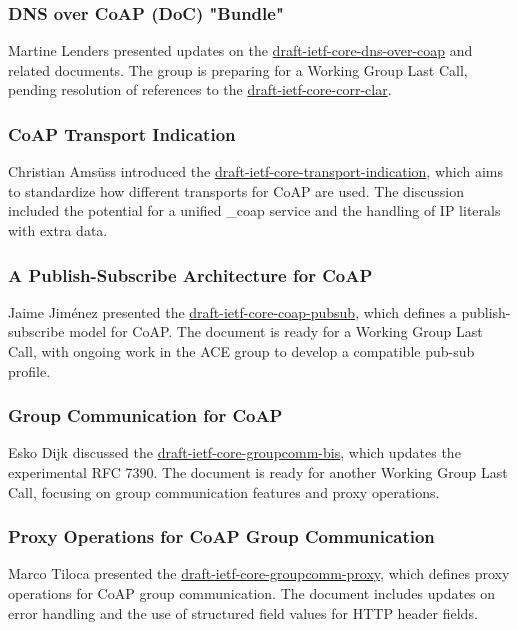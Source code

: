 \documentclass{article}
\begin{document}
\subsubsection{DNS over CoAP (DoC) "Bundle"}
Martine Lenders presented updates on the \href{https://datatracker.ietf.org/doc/html/draft-ietf-core-dns-over-coap}{draft-ietf-core-dns-over-coap} and related documents. The group is preparing for a Working Group Last Call, pending resolution of references to the \href{https://datatracker.ietf.org/doc/html/draft-ietf-core-corr-clar}{draft-ietf-core-corr-clar}.

\subsubsection{CoAP Transport Indication}
Christian Amsüss introduced the \href{https://datatracker.ietf.org/doc/html/draft-ietf-core-transport-indication}{draft-ietf-core-transport-indication}, which aims to standardize how different transports for CoAP are used. The discussion included the potential for a unified \_coap service and the handling of IP literals with extra data.

\subsubsection{A Publish-Subscribe Architecture for CoAP}
Jaime Jiménez presented the \href{https://datatracker.ietf.org/doc/html/draft-ietf-core-coap-pubsub}{draft-ietf-core-coap-pubsub}, which defines a publish-subscribe model for CoAP. The document is ready for a Working Group Last Call, with ongoing work in the ACE group to develop a compatible pub-sub profile.

\subsubsection{Group Communication for CoAP}
Esko Dijk discussed the \href{https://datatracker.ietf.org/doc/html/draft-ietf-core-groupcomm-bis}{draft-ietf-core-groupcomm-bis}, which updates the experimental RFC 7390. The document is ready for another Working Group Last Call, focusing on group communication features and proxy operations.

\subsubsection{Proxy Operations for CoAP Group Communication}
Marco Tiloca presented the \href{https://datatracker.ietf.org/doc/html/draft-ietf-core-groupcomm-proxy}{draft-ietf-core-groupcomm-proxy}, which defines proxy operations for CoAP group communication. The document includes updates on error handling and the use of structured field values for HTTP header fields.
\end{document}
